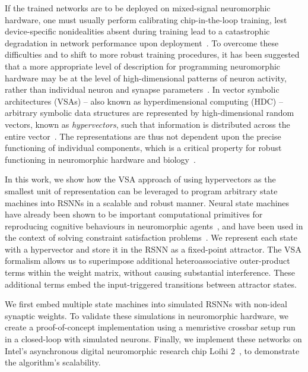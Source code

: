 If the trained networks are to be deployed on mixed-signal neuromorphic hardware, one must usually perform calibrating chip-in-the-loop training, lest device-specific nonidealities absent during training lead to a catastrophic degradation in network performance upon deployment~\cite{bohnstingl_biologically-inspired_2022, schmitt_neuromorphic_2017, demirag_online_2021, cakal_gradient-descent_2024, cramer_surrogate_2022}.
To overcome these difficulties and to shift to more robust training procedures, it has been suggested that a more appropriate level of description for programming neuromorphic hardware may be at the level of high-dimensional patterns of neuron activity, rather than individual neuron and synapse parameters~\cite{kleyko_vector_2022}. In vector symbolic architectures (VSAs) -- also known as hyperdimensional computing (HDC) -- arbitrary symbolic data structures are represented by high-dimensional random vectors, known as \textit{hypervectors}, such that information is distributed across the entire vector~\cite{kleyko_survey_2022, kanerva_hyperdimensional_2009, plate_holographic_1995, gayler_multiplicative_1998}. The representations are thus not dependent upon the precise functioning of individual components, which is a critical property for robust functioning in neuromorphic hardware and biology~\cite{karunaratne_-memory_2020, cotteret_vector_2024}.


In this work, we show how the VSA approach of using hypervectors as the smallest unit of representation can be leveraged to program arbitrary state machines into RSNNs in a scalable and robust manner.
Neural state machines have already been shown to be important computational primitives for reproducing cognitive behaviours in neuromorphic agents~\cite{neftci_synthesizing_2013},
and have been used in the context of solving constraint satisfaction problems~\cite{liang_neuromorphic_2019}.
We represent each state with a hypervector and store it in the RSNN as a fixed-point attractor. The VSA formalism allows us to superimpose additional heteroassociative outer-product terms within the weight matrix, without causing substantial interference. These additional terms embed the input-triggered transitions between attractor states.



We first embed multiple state machines into simulated RSNNs with non-ideal synaptic weights.
To validate these simulations in neuromorphic hardware, we create a proof-of-concept implementation using a memristive crossbar setup run in a closed-loop with simulated neurons. Finally, we implement these networks on Intel's asynchronous digital neuromorphic research chip Loihi 2~\cite{orchard_efficient_2021}, to demonstrate the algorithm's scalability.



